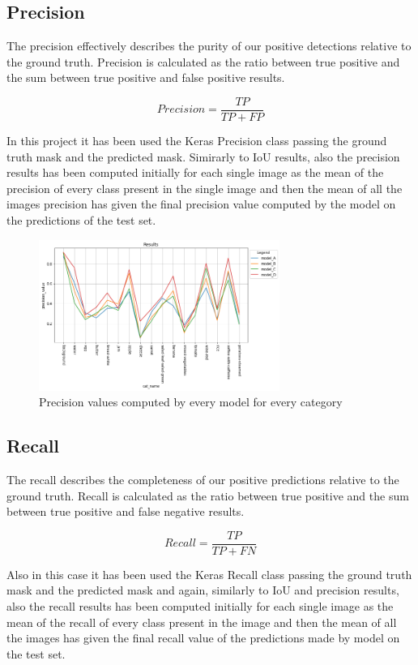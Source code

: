 \documentclass[a4paper,10pt]{report}
\begin{document}
\clearpage\subsection{Precision}\label{subsec:subsection-512}

The precision effectively describes the purity of our positive detections relative to the ground truth. Precision is calculated as the ratio between true positive and the sum between true positive and false positive results. 


\[Precision = \frac{TP}{TP + FP}\]

In this project it has been used the Keras Precision class passing the ground truth mask and the predicted mask.
Simirarly to IoU results, also the precision results has been computed initially for each single image as the mean of the precision of every class present in the single image and then the mean of all the images precision has given the final precision value computed by the model on the predictions of the test set.

\begin{figure}[h]
    \centering
    \includegraphics[width=0.7\textwidth]{assets/img/cat_prec.png}
    \caption{Precision values computed by every model for every category}
    \label{fig:cat_prec}
\end{figure}

\clearpage\subsection{Recall}\label{subsec:subsection-513}
The recall describes the completeness of our positive predictions relative to the ground truth. Recall is calculated as the ratio between true positive and the sum between true positive and false negative results. 


\[Recall = \frac{TP}{TP + FN}\]

Also in this case it has been used the Keras Recall class passing the ground truth mask and the predicted mask and again, similarly to IoU and precision results, also the recall results has been computed initially for each single image as the mean of the recall of every class present in the image and then the mean of all the images has given the final recall value of the predictions made by model on the test set.
\end{document}
